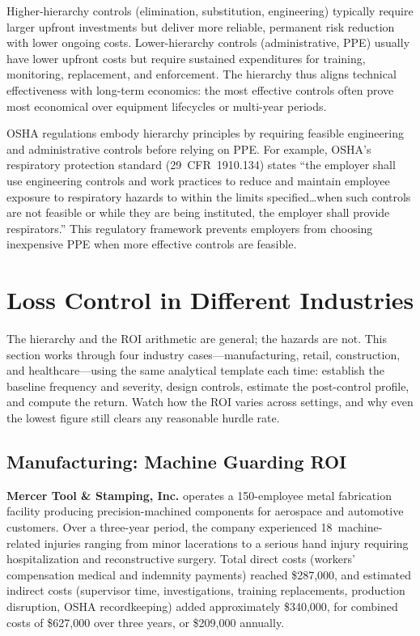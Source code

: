 \documentclass[11pt,openany]{book}
\begin{document}
Higher-hierarchy controls (elimination, substitution, engineering) typically
require larger upfront investments but deliver more reliable, permanent risk
reduction with lower ongoing costs. Lower-hierarchy controls (administrative,
PPE) usually have lower upfront costs but require sustained expenditures for
training, monitoring, replacement, and enforcement. The hierarchy thus aligns
technical effectiveness with long-term economics: the most effective controls
often prove most economical over equipment lifecycles or multi-year periods.

OSHA regulations embody hierarchy principles by requiring feasible engineering
and administrative controls before relying on PPE. For example, OSHA's
respiratory protection standard (29~CFR~1910.134) states ``the employer shall
use engineering controls and work practices to reduce and maintain employee
exposure to respiratory hazards to within the limits specified\ldots when such
controls are not feasible or while they are being instituted, the employer
shall provide respirators.'' This regulatory framework prevents employers from
choosing inexpensive PPE when more effective controls are feasible.

\section{Loss Control in Different Industries}
\label{sec:industries}

The hierarchy and the ROI arithmetic are general; the hazards are not. This
section works through four industry cases---manufacturing, retail,
construction, and healthcare---using the same analytical template each time:
establish the baseline frequency and severity, design controls, estimate the
post-control profile, and compute the return. Watch how the ROI varies across
settings, and why even the lowest figure still clears any reasonable hurdle
rate.

\subsection{Manufacturing: Machine Guarding ROI}
\label{subsec:mercer}

\textbf{Mercer Tool \& Stamping, Inc.} operates a 150-employee metal
fabrication facility producing precision-machined components for aerospace and
automotive customers. Over a three-year period, the company experienced
18~machine-related injuries ranging from minor lacerations to a serious hand
injury requiring hospitalization and reconstructive surgery. Total direct
costs (workers' compensation medical and indemnity payments) reached
\$287{,}000, and estimated indirect costs (supervisor time, investigations,
training replacements, production disruption, OSHA recordkeeping) added
approximately \$340{,}000, for combined costs of \$627{,}000 over three years,
or \$209{,}000 annually.
\end{document}

